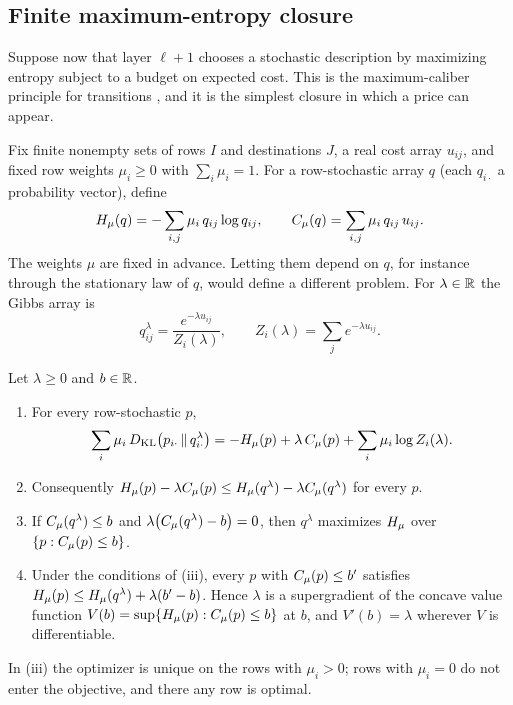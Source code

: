 \subsection{Finite maximum-entropy closure}

Suppose now that layer \(\ell+1\) chooses a stochastic description by maximizing entropy subject to a budget on expected cost. This is the maximum-caliber principle for transitions \cite{jaynes1957information,presse2013maxent}, and it is the simplest closure in which a price can appear.

Fix finite nonempty sets of rows \(I\) and destinations \(J\), a real cost array \(u_{ij}\), and fixed row weights \(\mu_i\ge0\) with \(\sum_i\mu_i=1\). For a row-stochastic array \(q\) (each \(q_{i\cdot}\) a probability vector), define
\[
H_{\mu}(q)=-\sum_{i,j}\mu_i\,q_{ij}\log q_{ij},\qquad
C_{\mu}(q)=\sum_{i,j}\mu_i\,q_{ij}\,u_{ij}.
\]
The weights \(\mu\) are fixed in advance. Letting them depend on \(q\), for instance through the stationary law of \(q\), would define a different problem. For \(\lambda\in\mathbb{R}\) the Gibbs array is
\[
q^{\lambda}_{ij}=\frac{e^{-\lambda u_{ij}}}{Z_i(\lambda)},\qquad Z_i(\lambda)=\sum_{j}e^{-\lambda u_{ij}} .
\]

\begin{theorem}\label{thm:duality}
Let \(\lambda\ge0\) and \(b\in\mathbb{R}\).
\begin{enumerate}[label=(\roman*),leftmargin=*]
\item For every row-stochastic \(p\),
\[
\sum_i\mu_i\,D_{\mathrm{KL}}\big(p_{i\cdot}\,\|\,q^{\lambda}_{i\cdot}\big)=-H_{\mu}(p)+\lambda\,C_{\mu}(p)+\sum_i\mu_i\log Z_i(\lambda).
\]
\item Consequently \(H_{\mu}(p)-\lambda C_{\mu}(p)\le H_{\mu}(q^\lambda)-\lambda C_{\mu}(q^\lambda)\) for every \(p\).
\item If \(C_{\mu}(q^\lambda)\le b\) and \(\lambda\big(C_{\mu}(q^\lambda)-b\big)=0\), then \(q^\lambda\) maximizes \(H_{\mu}\) over \(\{p:C_{\mu}(p)\le b\}\).
\item Under the conditions of (iii), every \(p\) with \(C_{\mu}(p)\le b'\) satisfies \(H_{\mu}(p)\le H_{\mu}(q^\lambda)+\lambda(b'-b)\). Hence \(\lambda\) is a supergradient of the concave value function \(V(b)=\sup\{H_{\mu}(p):C_{\mu}(p)\le b\}\) at \(b\), and \(V'(b)=\lambda\) wherever \(V\) is differentiable.
\end{enumerate}
In (iii) the optimizer is unique on the rows with \(\mu_i>0\); rows with \(\mu_i=0\) do not enter the objective, and there any row is optimal.
\end{theorem}

